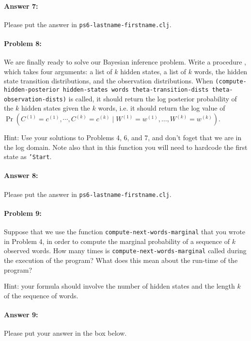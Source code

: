 \documentclass[10pt]{article}
\newcommand{\required}[1]{{\color{blue}{#1}}}
\newcommand{\PSnum}{6}
\begin{document}
\paragraph{Answer 7:} Please put the answer in
\texttt{ps\PSnum-lastname-firstname.clj}.

\hrulefill%

\paragraph{Problem 8:}
We are finally ready to solve our Bayesian inference problem. Write a
procedure \required{\texttt{compute-hidden-posterior}}, which takes four
arguments: a list of $k$ hidden states, a list of $k$ words, the
hidden state transition distributions, and the observation
distributions. When \texttt{(compute-hidden-posterior hidden-states
  words theta-transition-dists theta-observation-dists)} is called, it
should return the log posterior probability of the $k$ hidden states
given the $k$ words, i.e. it should return the log value of
$\Pr(C^{(1)}=c^{(1)},\cdots,C^{(k)}=c^{(k)} \mid%
W^{(1)}=w^{(1)},\dots,W^{(k)}=w^{(k)} )$.

Hint: Use your solutions to Problems 4, 6, and 7, and don't foget that
we are in the log domain. Note also that in this
function you will need to hardcode the first state as \texttt{'Start}.

\paragraph{Answer 8:} Please put the answer in
\texttt{ps\PSnum-lastname-firstname.clj}.

\hrulefill%

\paragraph{Problem 9:}
Suppose that we use the function \texttt{compute-next-words-marginal}
that you wrote in Problem 4, in order to compute the marginal
probability of a sequence of $k$ observed words. How many times is
\texttt{compute-next-words-marginal} called during the execution of the
program? What does this mean about the run-time of the program?

 Hint: your formula should involve the number of hidden
states and the length $k$ of the sequence of words.

\paragraph{Answer 9:} Please put your answer in the box below.
\end{document}
